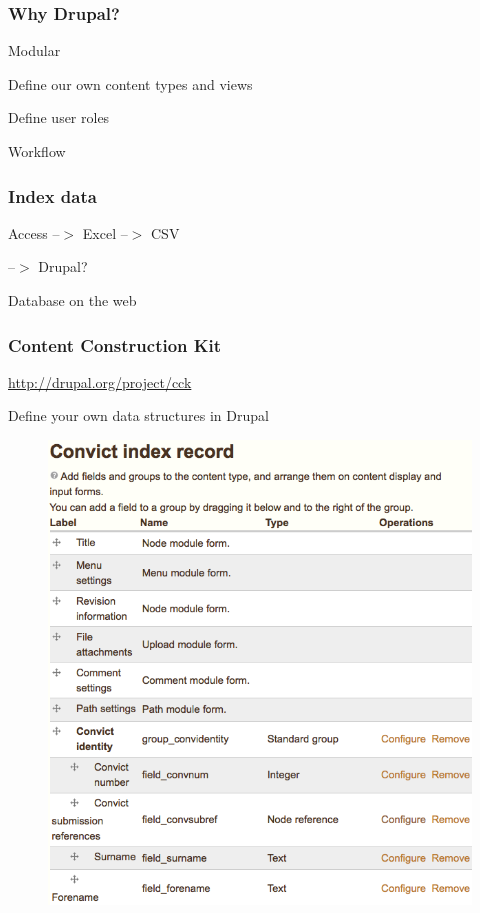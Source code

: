 \documentclass[ignorenonframetext,11pt]{beamer}
\begin{document}
\begin{frame}
\frametitle{Why Drupal?}
\label{whydrupal}

Modular


Define our own content types and views


Define user roles


Workflow



\end{frame}
		

\begin{frame}
\frametitle{Index data}
\label{indexdata}

Access --$>$ Excel --$>$ CSV


--$>$ Drupal?


Database on the web



\end{frame}
		

\begin{frame}
\frametitle{Content Construction Kit}
\label{contentconstructionkit}

\url{http://drupal.org/project/cck}


Define your own data structures in Drupal


\begin{figure}
	\label{convindex}
	\begin{center}
	\includegraphics[keepaspectratio,width=\textwidth, height=.75\textheight]{images/convindex.png}
	\end{center}
	\end{figure}
	



\end{frame}
		
\end{document}
